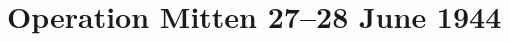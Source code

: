 \documentclass[noraggedright]{turabian-researchpaper}
\begin{document}





\section{Operation Mitten 27--28 June 1944}




\end{document}
